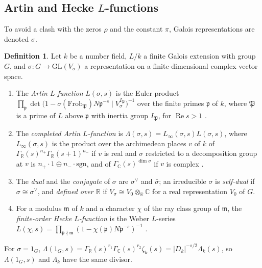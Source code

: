 \documentclass[11pt]{amsart}
\theoremstyle{plain}
\theoremstyle{definition}
\newtheorem{definition}[theorem]{Definition}
\theoremstyle{remark}
\numberwithin{equation}{section}
\newcommand{\C}{\mathbb{C}}
\newcommand{\R}{\mathbb{R}}
\newcommand{\GR}{\Gamma_{\mathbb{R}}}
\newcommand{\GC}{\Gamma_{\mathbb{C}}}
\DeclareMathOperator{\Rea}{Re}
\renewcommand{\Re}{\Rea}
\begin{document}
\subsection{Artin and Hecke \texorpdfstring{$L$}{L}-functions}
\label{subsec:artin}

To avoid a clash with the zeros $\rho$ and the constant $\pi$, Galois
representations are denoted $\sigma$.

\begin{definition}\label{def:artin}
Let $k$ be a number field, $L/k$ a finite Galois extension with group
$G$, and $\sigma:G\to\mathrm{GL}(V_\sigma)$ a representation on a
finite-dimensional complex vector space.
\begin{enumerate}[label=(\alph*)]
\item The \emph{Artin $L$-function} $L(\sigma,s)$ is the Euler product
  $\prod_{\mathfrak p}\det\bigl(1-\sigma(\mathrm{Frob}_{\mathfrak P})
  N\mathfrak p^{-s}\mid V_\sigma^{I_{\mathfrak P}}\bigr)^{-1}$ over the
  finite primes $\mathfrak p$ of $k$, where $\mathfrak P$ is a prime of
  $L$ above $\mathfrak p$ with inertia group $I_{\mathfrak P}$, for
  $\Re s>1$ \cite[pp.~9 and~11--12]{Cogdell2014ArtinLFunctions}.
\item The \emph{completed Artin $L$-function} is
  $\Lambda(\sigma,s)=L_\infty(\sigma,s)L(\sigma,s)$, where
  $L_\infty(\sigma,s)$ is the product over the archimedean places $v$ of
  $k$ of $\GR(s)^{n_+}\GR(s+1)^{n_-}$ if $v$ is real and $\sigma$
  restricted to a decomposition group at $v$ is $n_+\cdot1\oplus n_-\cdot
  \mathrm{sgn}$, and of $\GC(s)^{\dim\sigma}$ if $v$ is complex
  \cite[p.~13]{Cogdell2014ArtinLFunctions}.
\item The \emph{dual} and the \emph{conjugate} of $\sigma$ are
  $\sigma^\vee$ and $\bar\sigma$; an irreducible $\sigma$ is
  \emph{self-dual} if $\sigma\cong\sigma^\vee$, and \emph{defined over
  $\R$} if $V_\sigma\cong V_0\otimes_\R\C$ for a real representation
  $V_0$ of $G$.
\item For a modulus $\mathfrak m$ of $k$ and a character $\chi$ of the
  ray class group of $\mathfrak m$, the \emph{finite-order Hecke
  $L$-function} is the Weber $L$-series
  $L(\chi,s)=\prod_{\mathfrak p\nmid\mathfrak m}
  (1-\chi(\mathfrak p)N\mathfrak p^{-s})^{-1}$
  \cite[p.~8]{Milne2020CFT}.
\end{enumerate}
\end{definition}

For $\sigma=1_G$, $\Lambda(1_G,s)=\GR(s)^{r_1}\GC(s)^{r_2}\zeta_k(s)
=|D_k|^{-s/2}\Lambda_k(s)$, so $\Lambda(1_G,s)$ and $\Lambda_k$ have
the same divisor.
\end{document}
